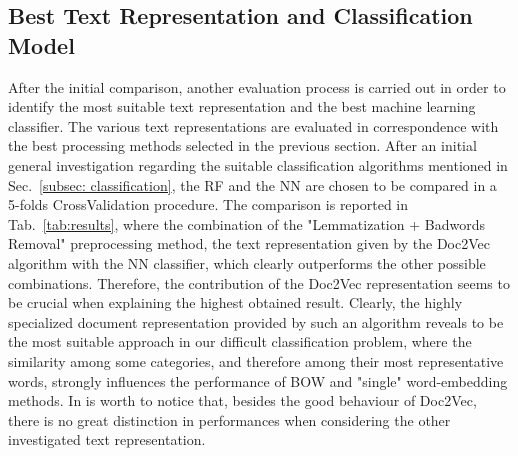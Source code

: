 \documentclass[10pt]{article}
\begin{document}
\subsection{Best Text Representation and Classification Model}
After the initial comparison, another evaluation process is carried out in order to identify the most suitable text representation and the best machine learning classifier. 
The various text representations are evaluated in correspondence with the best processing methods selected in the previous section.
After an initial general investigation regarding the suitable classification algorithms mentioned in Sec.~\ref{subsec: classification}, the RF and the NN are chosen to be compared in a 5-folds CrossValidation procedure.
The comparison is reported in Tab.~\ref{tab:results}, where the combination of the "Lemmatization + Badwords Removal" preprocessing method, the text representation given by the Doc2Vec algorithm with the NN classifier, which clearly outperforms the other possible combinations.
Therefore, the contribution of the Doc2Vec representation seems to be crucial when explaining the highest obtained result. 
Clearly, the highly specialized document representation provided by such an algorithm reveals to be the most suitable approach in our difficult classification problem, where the similarity among some categories, and therefore among their most representative words, strongly influences the performance of BOW and "single" word-embedding methods.
In is worth to notice that, besides the good behaviour of Doc2Vec, there is no great distinction in performances when considering the other investigated text representation.
\end{document}
